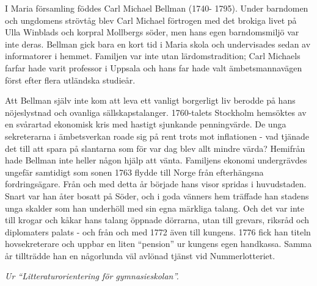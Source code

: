 \vspace{10pt}
\hspace{10pt}I Maria församling föddes Carl Michael Bellman (1740-
1795). Under barndomen och ungdomens strövtåg blev Carl 
Michael förtrogen med det brokiga livet på Ulla Winblads och 
korpral Mollbergs söder, men hans egen barndomsmiljö var inte 
deras. Bellman gick bara en kort tid i Maria skola och 
undervisades sedan av informatorer i hemmet. Familjen var inte 
utan lärdomstradition; Carl Michaels farfar hade varit professor i 
Uppsala och hans far hade valt ämbetsmannavägen först efter 
flera utländska studieår.\par
\hspace{10pt} Att Bellman själv inte kom att leva ett vanligt borgerligt 
liv berodde på hans nöjeslystnad och ovanliga sällskapstalanger. 
1760-talets Stockholm hemsöktes av en svårartad ekonomisk kris 
med hastigt sjunkande penningvärde. De unga sekreterarna i 
ämbetsverkan roade sig på rent trots mot inflationen - vad 
tjänade det till att spara på slantarna som för var dag blev 
allt mindre värda? Hemifrån hade Bellman inte heller någon 
hjälp att vänta. Familjens ekonomi undergrävdes ungefär samtidigt som 
sonen 1763 flydde till Norge från efterhängsna fordringsägare. 
Från och med detta år började hans visor spridas i huvudstaden. 
Snart var han åter bosatt på Söder, och i goda vänners hem 
träffade han stadens unga skalder som han underhöll med sin 
egna märkliga talang. Och det var inte till krogar och kåkar hans 
talang öppnade dörrarna, utan till grevars, riksråd och 
diplomaters palats - och från och med 1772 även till kungens. 
1776 fick han titeln hovsekreterare och uppbar en liten 
``pension'' ur kungens egen handkassa. Samma år tillträdde han en 
någorlunda väl avlönad tjänst vid Nummerlotteriet.\par
\vspace{10pt}
{\footnotesize\textit{Ur ``Litteraturorientering för gymnasieskolan''.}}
